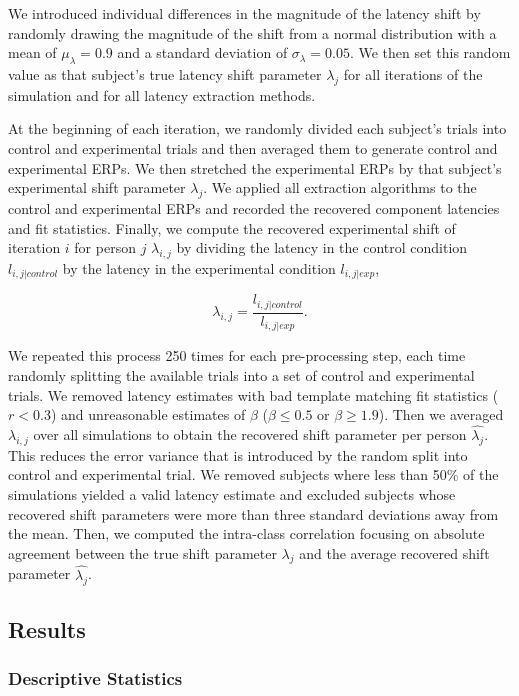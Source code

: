 \documentclass[
  man]{apa7}
\begin{document}
We introduced individual differences in the magnitude of the latency shift by randomly drawing the magnitude of the shift from a normal distribution with a mean of \(\mu_\lambda = 0.9\) and a standard deviation of \(\sigma_\lambda = 0.05\). We then set this random value as that subject's true latency shift parameter \(\lambda_j\) for all iterations of the simulation and for all latency extraction methods.

At the beginning of each iteration, we randomly divided each subject's trials into control and experimental trials and then averaged them to generate control and experimental ERPs. We then stretched the experimental ERPs by that subject's experimental shift parameter \(\lambda_j\). We applied all extraction algorithms to the control and experimental ERPs and recorded the recovered component latencies and fit statistics. Finally, we compute the recovered experimental shift of iteration \(i\) for person \(j\) \(\lambda_{i, j}\) by dividing the latency in the control condition \(l_{i, j|control}\) by the latency in the experimental condition \(l_{i, j|exp}\),

\[\lambda_{i, j} = \frac{l_{i, j|control}}{l_{i, j|exp}}.\]

We repeated this process 250 times for each pre-processing step, each time randomly splitting the available trials into a set of control and experimental trials. We removed latency estimates with bad template matching fit statistics (\(r < 0.3\)) and unreasonable estimates of \(\beta\) (\(\beta \le 0.5\) or \(\beta \ge 1.9\)). Then we averaged \(\lambda_{i, j}\) over all simulations to obtain the recovered shift parameter per person \(\hat{\lambda_j}\). This reduces the error variance that is introduced by the random split into control and experimental trial. We removed subjects where less than 50\% of the simulations yielded a valid latency estimate and excluded subjects whose recovered shift parameters were more than three standard deviations away from the mean. Then, we computed the intra-class correlation focusing on absolute agreement between the true shift parameter \(\lambda_j\) and the average recovered shift parameter \(\hat{\lambda_j}\).

\hypertarget{results-1}{%
\subsection{Results}\label{results-1}}

\hypertarget{descriptive-statistics-1}{%
\subsubsection{Descriptive Statistics}\label{descriptive-statistics-1}}
\end{document}
